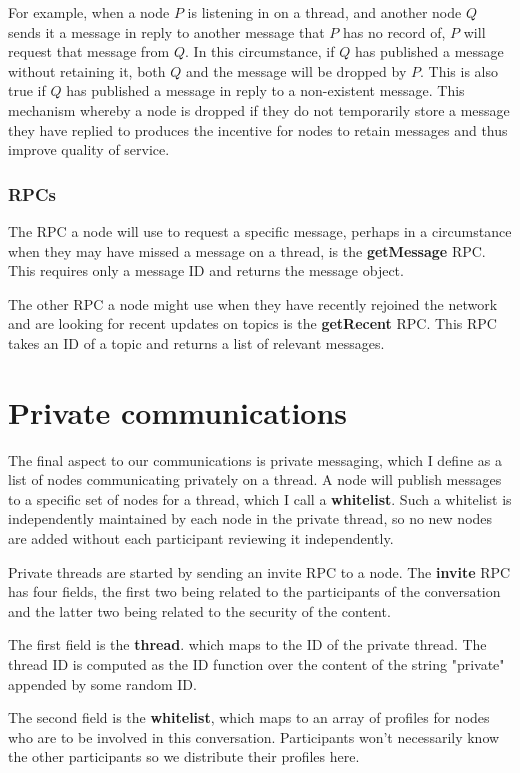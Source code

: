\documentclass[10pt,a4paper,onecolumn]{article}
\begin{document}
For example, when a node $P$ is listening in on a thread, and another node $Q$ sends it a message in reply to another message that $P$ has no record of, $P$ will request that message from $Q$. In this circumstance, if $Q$ has published a message without retaining it, both $Q$ and the message will be dropped by $P$. This is also true if $Q$ has published a message in reply to a non-existent message. This mechanism whereby a node is dropped if they do not temporarily store a message they have replied to produces the incentive for nodes to retain messages and thus improve quality of service.

\subsubsection*{RPCs}
The RPC a node will use to request a specific message, perhaps in a circumstance when they may have missed a message on a thread, is the \textbf{getMessage} RPC. This requires only a message ID and returns the message object. 

The other RPC a node might use when they have recently rejoined the network and are looking for recent updates on topics is the \textbf{getRecent} RPC. This RPC takes an ID of a topic and returns a list of relevant messages.

\section{Private communications}
\label{private}
The final aspect to our communications is private messaging, which I define as a list of nodes communicating privately on a thread. A node will publish messages to a specific set of nodes for a thread, which I call a \textbf{whitelist}. Such a whitelist is independently maintained by each node in the private thread, so no new nodes are added without each participant reviewing it independently. 

Private threads are started by sending an invite RPC to a node. The \textbf{invite} RPC has four fields, the first two being related to the participants of the conversation and the latter two being related to the security of the content.

The first field is the \textbf{thread}. which maps to the ID of the private thread. The thread ID is computed as the ID function over the content of the string "private" appended by some random ID.

The second field is the \textbf{whitelist}, which maps to an array of profiles for nodes who are to be involved in this conversation. Participants won't necessarily know the other participants so we distribute their profiles here. 
\end{document}
